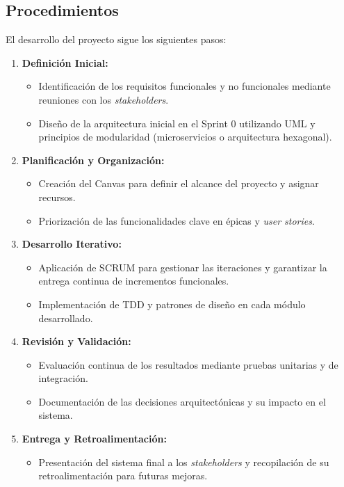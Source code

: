 \documentclass[conference]{IEEEtran}
\begin{document}
\subsection{Procedimientos}

El desarrollo del proyecto sigue los siguientes pasos:
\begin{enumerate}
    \item \textbf{Definición Inicial:}
    \begin{itemize}
        \item Identificación de los requisitos funcionales y no funcionales mediante reuniones con los \textit{stakeholders}.
        \item Diseño de la arquitectura inicial en el Sprint 0 utilizando UML y principios de modularidad (microservicios o arquitectura hexagonal).
    \end{itemize}
    \item \textbf{Planificación y Organización:}
    \begin{itemize}
        \item Creación del Canvas para definir el alcance del proyecto y asignar recursos.
        \item Priorización de las funcionalidades clave en épicas y \textit{user stories}.
    \end{itemize}
    \item \textbf{Desarrollo Iterativo:}
    \begin{itemize}
        \item Aplicación de SCRUM para gestionar las iteraciones y garantizar la entrega continua de incrementos funcionales.
        \item Implementación de TDD y patrones de diseño en cada módulo desarrollado.
    \end{itemize}
    \item \textbf{Revisión y Validación:}
    \begin{itemize}
        \item Evaluación continua de los resultados mediante pruebas unitarias y de integración.
        \item Documentación de las decisiones arquitectónicas y su impacto en el sistema.
    \end{itemize}
    \item \textbf{Entrega y Retroalimentación:}
    \begin{itemize}
        \item Presentación del sistema final a los \textit{stakeholders} y recopilación de su retroalimentación para futuras mejoras.\\
    \end{itemize}
\end{enumerate}
\end{document}
